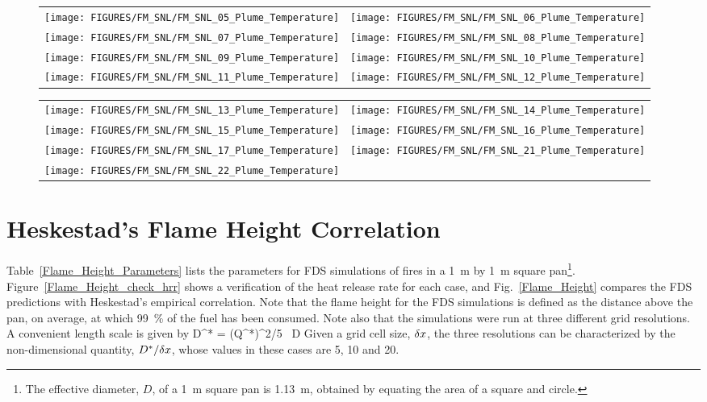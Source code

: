 \newpage

\begin{figure}[p]
\begin{tabular*}{\textwidth}{l@{\extracolsep{\fill}}r}
\texttt{[image: FIGURES/FM\_SNL/FM\_SNL\_05\_Plume\_Temperature]} &
\texttt{[image: FIGURES/FM\_SNL/FM\_SNL\_06\_Plume\_Temperature]} \\
\texttt{[image: FIGURES/FM\_SNL/FM\_SNL\_07\_Plume\_Temperature]} &
\texttt{[image: FIGURES/FM\_SNL/FM\_SNL\_08\_Plume\_Temperature]} \\
\texttt{[image: FIGURES/FM\_SNL/FM\_SNL\_09\_Plume\_Temperature]} &
\texttt{[image: FIGURES/FM\_SNL/FM\_SNL\_10\_Plume\_Temperature]} \\
\texttt{[image: FIGURES/FM\_SNL/FM\_SNL\_11\_Plume\_Temperature]} &
\texttt{[image: FIGURES/FM\_SNL/FM\_SNL\_12\_Plume\_Temperature]}
\end{tabular*}
\label{FM_SNL_Plume_2}
\end{figure}

\begin{figure}[p]
\begin{tabular*}{\textwidth}{l@{\extracolsep{\fill}}r}
\texttt{[image: FIGURES/FM\_SNL/FM\_SNL\_13\_Plume\_Temperature]} &
\texttt{[image: FIGURES/FM\_SNL/FM\_SNL\_14\_Plume\_Temperature]} \\
\texttt{[image: FIGURES/FM\_SNL/FM\_SNL\_15\_Plume\_Temperature]} &
\texttt{[image: FIGURES/FM\_SNL/FM\_SNL\_16\_Plume\_Temperature]} \\
\texttt{[image: FIGURES/FM\_SNL/FM\_SNL\_17\_Plume\_Temperature]} &
\texttt{[image: FIGURES/FM\_SNL/FM\_SNL\_21\_Plume\_Temperature]} \\
\texttt{[image: FIGURES/FM\_SNL/FM\_SNL\_22\_Plume\_Temperature]} &

\end{tabular*}
\label{FM_SNL_Plume_3}
\end{figure}

\clearpage

\section{Heskestad's Flame Height Correlation}


Table~\ref{Flame_Height_Parameters} lists the parameters for FDS simulations of fires in a 1~m by 1~m square pan\footnote{The effective diameter, $D$, of a 1~m square pan is 1.13~m, obtained by equating the area of a square and circle.}. Figure~\ref{Flame_Height_check_hrr} shows a verification of the heat release rate for each case, and Fig.~\ref{Flame_Height} compares the FDS predictions with Heskestad's empirical correlation. Note that the flame height for the FDS simulations is defined as the distance above the pan, on average, at which 99~\% of the fuel has been consumed. Note also that the simulations were run at three different grid resolutions. A convenient length scale is given by
\be
   D^* = (Q^*)^{2/5} \, D
\ee
Given a grid cell size, $\delta x$, the three resolutions can be characterized by the non-dimensional quantity, $D^*/\delta x$, whose values in these cases are 5, 10 and 20.

